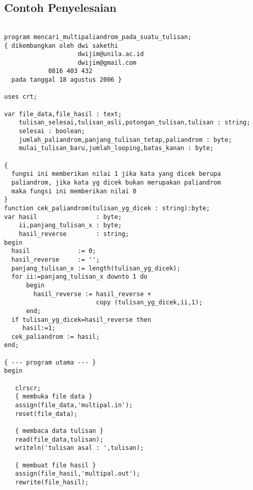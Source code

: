 \documentclass[a4paper,10pt,makeidx]{article}
\begin{document}
\subsection{Contoh Penyelesaian}
\begin{verbatim}

program mencari_multipaliandrom_pada_suatu_tulisan;
{ dikembangkan oleh dwi sakethi
                    dwijim@unila.ac.id
                    dwijim@gmail.com
		    0816 403 432
  pada tanggal 18 agustus 2006 }

uses crt;

var file_data,file_hasil : text;
    tulisan_selesai,tulisan_asli,potongan_tulisan,tulisan : string;
    selesai : boolean;
    jumlah_paliandrom,panjang_tulisan_tetap,paliandrom : byte;
    mulai_tulisan_baru,jumlah_looping,batas_kanan : byte;

{
  fungsi ini memberikan nilai 1 jika kata yang dicek berupa
  paliandrom, jika kata yg dicek bukan merupakan paliandrom
  maka fungsi ini memberikan nilai 0
}
function cek_paliandrom(tulisan_yg_dicek : string):byte;
var hasil                : byte;
    ii,panjang_tulisan_x : byte;
    hasil_reverse        : string;
begin
  hasil             := 0;
  hasil_reverse     := '';
  panjang_tulisan_x := length(tulisan_yg_dicek);
  for ii:=panjang_tulisan_x downto 1 do
      begin
        hasil_reverse := hasil_reverse + 
                         copy (tulisan_yg_dicek,ii,1);
      end;
  if tulisan_yg_dicek=hasil_reverse then
     hasil:=1;
  cek_paliandrom := hasil;
end;

{ --- program utama --- }
begin
   
   clrscr;
   { membuka file data }
   assign(file_data,'multipal.in');
   reset(file_data);

   { membaca data tulisan }
   read(file_data,tulisan);
   writeln('tulisan asal : ',tulisan);

   { membuat file hasil }
   assign(file_hasil,'multipal.out');
   rewrite(file_hasil);


\end{verbatim}
\end{document}
